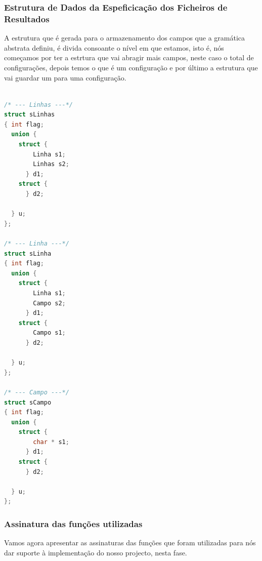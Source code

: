 \documentclass[11pt, a4paper, oneside]{article}
\begin{document}
\subsubsection{Estrutura de Dados da Espeficicação dos Ficheiros de Resultados}

A estrutura que é gerada para o armazenamento dos campos que a gramática abstrata definiu, é divida consoante o nível em que estamos, isto é, nós começamos por ter a estrtura que vai abragir mais campos, neste caso o total de configurações, depois temos o que é um configuração e por último a estrutura que vai guardar um para uma configuração.

\begin{lstlisting}[language=C, caption={Estrutura de dados para armazenar a especificação dos ficheiros de resultados.}]

/* --- Linhas ---*/
struct sLinhas 
{ int flag;
  union {  
    struct {
        Linha s1;
        Linhas s2;
      } d1;
    struct {
      } d2;

  } u;
};

/* --- Linha ---*/
struct sLinha 
{ int flag;
  union {  
    struct {
        Linha s1;
        Campo s2;
      } d1;
    struct {
        Campo s1;
      } d2;

  } u;
};

/* --- Campo ---*/
struct sCampo 
{ int flag;
  union {  
    struct {
        char * s1;
      } d1;
    struct {
      } d2;

  } u;
};

\end{lstlisting}

\subsubsection{Assinatura das funções utilizadas}
Vamos agora apresentar as assinaturas das funções que foram utilizadas para nós dar suporte à implementação do nosso projecto, nesta fase.
\end{document}
